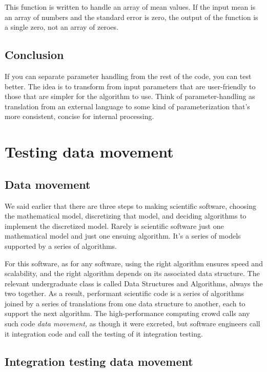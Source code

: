 \documentclass[fleqn,10pt]{olplainarticle}
\begin{document}
This function is written to handle an array of mean values.
If the input mean is an array of numbers and the standard error
is zero, the output of the function is a single zero, not an array
of zeroes.

\subsection{Conclusion}
If you can separate parameter handling from the rest of the code,
you can test better. The idea is to transform from input parameters
that are user-friendly to those that are simpler for the algorithm
to use.
Think of parameter-handling as translation from an external
     language to some kind of parameterization that's more
     consistent, concise for internal processing.


\section{Testing data movement}

\subsection{Data movement}

We said earlier that there are three steps to making scientific
software, choosing the mathematical model, discretizing that
model, and deciding algorithms to implement the discretized model.
Rarely is scientific software just one mathematical model
and just one ensuing algorithm. It's a series of models supported
by a series of algorithms.

For this software, as for any software, using the right algorithm
ensures speed and scalability, and the right algorithm depends on
its associated data structure. The relevant undergraduate class
is called Data Structures and Algorithms, always the two together.
As a result, performant scientific code is a series of algorithms
joined by a series of translations from one data structure to
another, each to support the next algorithm. The high-performance
computing crowd calls any such code \emph{data movement,} as though
it were excreted, but software engineers call it integration code
and call the testing of it integration testing.

\subsection{Integration testing data movement}
\end{document}
